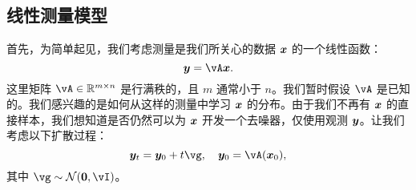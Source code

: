 \documentclass[../../book-main_zh.tex]{subfiles}
\begin{document}


\subsection{线性测量模型}
首先，为简单起见，我们考虑测量是我们所关心的数据 $\bm{x}$ 的一个线性函数：
\begin{equation}
    \y = \vA\x.
\end{equation}
这里矩阵 $\vA \in \mathbb{R}^{m\times n}$ 是行满秩的，且 $m$ 通常小于 $n$。我们暂时假设 $\vA$ 是已知的。我们感兴趣的是如何从这样的测量中学习 $\bm{x}$ 的分布。由于我们不再有 $\bm{x}$ 的直接样本，我们想知道是否仍然可以为 $\bm{x}$ 开发一个去噪器，仅使用观测 $\bm{y}$。让我们考虑以下扩散过程：
\begin{equation}
    \y_t = \y_0 + t \vg, \quad \y_0 = \vA(\x_0), 
\end{equation}
其中 $\vg \sim \mathcal{N}(\boldsymbol{0}, \vI)$。
\end{document}
